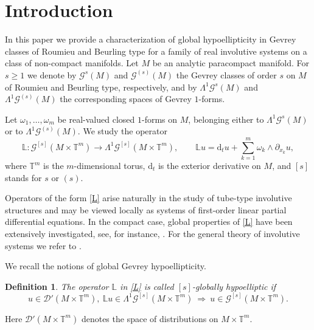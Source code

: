 \documentclass[11pt,reqno]{amsart}
\numberwithin{equation}{section}
\newtheorem{definition}[theorem]{Definition}
\begin{document}
	
	\maketitle
	
	
	\section{Introduction}
	
	In this paper we provide a characterization of global hypoellipticity in Gevrey classes of Roumieu and Beurling type for a family of real involutive systems on a class of non-compact manifolds. 
	Let $M$ be an analytic paracompact manifold. For $s\ge1$ we denote by $\mathscr{G}^s(M)$ and $\mathscr{G}^{(s)}(M)$ the Gevrey classes of order $s$ on $M$ of Roumieu and Beurling type, respectively, and by $\mathsf{\Lambda}^1\mathscr{G}^s(M)$ and $\mathsf{\Lambda}^1\mathscr{G}^{(s)}(M)$ the corresponding spaces of Gevrey $1$-forms.
	
	Let $\omega_1,\dots,\omega_m$ be real-valued closed $1$-forms on $M$, belonging either to $\mathsf{\Lambda}^1\mathscr{G}^s(M)$ or to $\mathsf{\Lambda}^1\mathscr{G}^{(s)}(M)$. We study the operator
	\begin{equation}\label{L}
		\mathbb{L}:\mathscr{G}^{[s]}(M\times\mathbb{T}^m)\longrightarrow \mathsf{\Lambda}^1 \mathscr{G}^{[s]}(M\times\mathbb{T}^m),
		\qquad 
		\mathbb{L}u = \mathrm{d}_t u + \sum_{k=1}^{m} \omega_k \wedge \partial_{x_k} u,
	\end{equation}
	where $\mathbb{T}^m$ is the $m$-dimensional torus, $\mathrm{d}_t$ is the exterior derivative on $M$, and $[s]$ stands for $s$ or $(s)$. 
	
	Operators of the form \eqref{L} arise naturally in the study of tube-type involutive structures and may be viewed locally as systems of first-order linear partial differential equations. In the compact case, global properties of \eqref{L} have been extensively investigated, see, for instance, \cite{BCM1993,BCP1996,BP1999_jmaa,ADL2023gh,ADL2023gs,HZ2017,HZ2019,LM2024}. For the general theory of involutive systems we refer to \cite{BCH_book,Treves}.
	
	We recall the notions of global Gevrey hypoellipticity.
	
	\begin{definition}
		The operator $\mathbb{L}$ in \eqref{L} is called $[s]$-globally hypoelliptic if
			\[
			u \in \mathscr{D}'(M\times\mathbb{T}^m),\ \mathbb{L}u \in \mathsf{\Lambda}^1 \mathscr{G}^{[s]}(M\times\mathbb{T}^m)
			\ \Rightarrow\ 
			u \in \mathscr{G}^{[s]}(M\times\mathbb{T}^m).
			\]
	\end{definition}
	Here $\mathscr{D}'(M\times\mathbb{T}^m)$ denotes the space of distributions on $M\times\mathbb{T}^m$.
	
\end{document}
